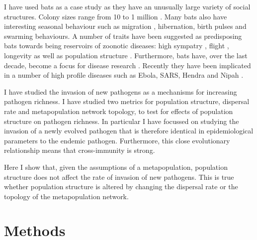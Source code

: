 I have used bats as a case study as they have an unusually large variety of social structures.
Colony sizes range from 10 to 1 million \cite{jones2009pantheria}.
Many bats also have interesting seasonal behaviour such as migration \cite{richter2008first, fleming2003ecology}, hibernation, birth pulses and swarming behaviours.
A number of traits have been suggested as predisposing bats towards being reservoirs of zoonotic diseases: high sympatry \cite{luis2013comparison}, flight \cite{wang2011mass}, longevity \cite{wang2011mass} as well as population structure \cite{maganga2014bat, turmelle2009correlates, gay2014parasite}.
Furthermore, bats have, over the last decade, become a focus for disease research  \cite{calisher2006bats, hughes2007emerging}.
Recently they have been implicated in a number of high profile diseases such as Ebola, SARS, Hendra and Nipah  \cite{calisher2006bats, li2005bats}.





I have studied the invasion of new pathogens as a mechanisms for increasing pathogen richness.
I have studied two metrics for population structure, dispersal rate and metapopulation network topology, to test for effects of population structure on pathogen richness.
In particular I have focussed on studying the invasion of a newly evolved pathogen that is therefore identical in epidemiological parameters to the endemic pathogen.
Furthermore, this close evolutionary relationship means that cross-immunity is strong.


Here I show that, given the assumptions of a metapopulation, population structure does not affect the rate of invasion of new pathogens.
This is true whether population structure is altered by changing the dispersal rate or the topology of the metapopulation network.






\section{Methods}

